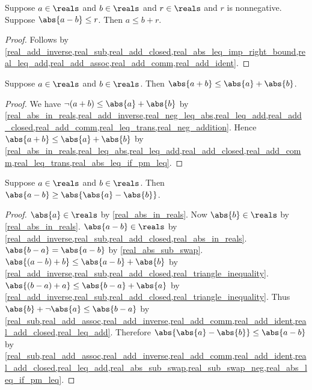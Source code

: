 \begin{proposition}\label{real_abs_sub_leq_imp_right_bound}
    Suppose $a\in\reals$ and $b\in\reals$ and $r\in\reals$ and $r$ is nonnegative.
    Suppose $\abs{a - b} \leq r$.
    Then $a \leq b + r$.
\end{proposition}
\begin{proof}
    Follows by \cref{real_add_inverse,real_sub,real_add_closed,real_abs_leq_imp_right_bound,real_leq_add,real_add_assoc,real_add_comm,real_add_ident}.
\end{proof}

\begin{proposition}\label{real_triangle_inequality}
    Suppose $a\in\reals$ and $b\in\reals$.
    Then $\abs{a + b} \leq \abs{a} + \abs{b}$.
\end{proposition}
\begin{proof}
    We have $\neg{(a + b)} \leq \abs{a} + \abs{b}$ by \cref{real_abs_in_reals,real_add_inverse,real_neg_leq_abs,real_leq_add,real_add_closed,real_add_comm,real_leq_trans,real_neg_addition}.
    Hence $\abs{a + b} \leq \abs{a} + \abs{b}$ by \cref{real_abs_in_reals,real_leq_abs,real_leq_add,real_add_closed,real_add_comm,real_leq_trans,real_abs_leq_if_pm_leq}.
\end{proof}

\begin{proposition}\label{real_reverse_triangle_inequality}
    Suppose $a\in\reals$ and $b\in\reals$.
    Then $\abs{a - b} \geq \abs{\abs{a} - \abs{b}}$.
\end{proposition}
\begin{proof}
    $\abs{a}\in\reals$ by \cref{real_abs_in_reals}.
    Now $\abs{b}\in\reals$ by \cref{real_abs_in_reals}.
    $\abs{a - b}\in\reals$ by \cref{real_add_inverse,real_sub,real_add_closed,real_abs_in_reals}.
    $\abs{b - a} = \abs{a - b}$ by \cref{real_abs_sub_swap}.
    $\abs{(a - b) + b} \leq \abs{a - b} + \abs{b}$ by \cref{real_add_inverse,real_sub,real_add_closed,real_triangle_inequality}.
    $\abs{(b - a) + a} \leq \abs{b - a} + \abs{a}$ by \cref{real_add_inverse,real_sub,real_add_closed,real_triangle_inequality}.
    Thus $\abs{b} + \neg{\abs{a}} \leq \abs{b - a}$ by \cref{real_sub,real_add_assoc,real_add_inverse,real_add_comm,real_add_ident,real_add_closed,real_leq_add}.
    Therefore $\abs{\abs{a} - \abs{b}} \leq \abs{a - b}$ by \cref{real_sub,real_add_assoc,real_add_inverse,real_add_comm,real_add_ident,real_add_closed,real_leq_add,real_abs_sub_swap,real_sub_swap_neg,real_abs_leq_if_pm_leq}.
\end{proof}

